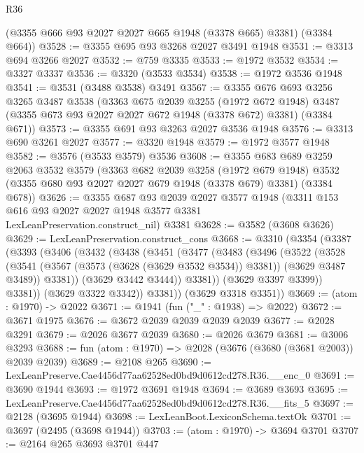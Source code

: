 \begin{lexlean}{R36}
\begin{coremodule}
      (@3355 @666 @93 @2027 @2027 @665 @1948 (@3378 @665) @3381)
      (@3384 @664))
@3528 := @3355 @695 @93 @3268 @2027 @3491 @1948
@3531 := @3313 @694 @3266 @2027
@3532 := @759 @3335
@3533 := @1972 @3532
@3534 := @3327 @3337
@3536 := @3320 (@3533 @3534)
@3538 := @1972 @3536 @1948
@3541 := @3531 (@3488 @3538) @3491
@3567 := @3355
    @676
    @693
    @3256
    @3265
    @3487
    @3538
    (@3363
      @675
      @2039
      @3255
      (@1972 @672 @1948)
      @3487
      (@3355 @673 @93 @2027 @2027 @672 @1948 (@3378 @672) @3381)
      (@3384 @671))
@3573 := @3355 @691 @93 @3263 @2027 @3536 @1948
@3576 := @3313 @690 @3261 @2027
@3577 := @3320 @1948
@3579 := @1972 @3577 @1948
@3582 := @3576 (@3533 @3579) @3536
@3608 := @3355
    @683
    @689
    @3259
    @2063
    @3532
    @3579
    (@3363
      @682
      @2039
      @3258
      (@1972 @679 @1948)
      @3532
      (@3355 @680 @93 @2027 @2027 @679 @1948 (@3378 @679) @3381)
      (@3384 @678))
@3626 := @3355
    @687
    @93
    @2039
    @2027
    @3577
    @1948
    (@3311 @153 @616 @93 @2027 @2027 @1948 @3577 @3381 LexLeanPreservation.construct_nil)
    @3381
@3628 := @3582 (@3608 @3626)
@3629 := LexLeanPreservation.construct_cons
@3668 := @3310
    (@3354
      (@3387
        (@3393
          (@3406
            (@3432
              (@3438
                (@3451
                  (@3477
                    (@3483
                      (@3496
                        (@3522
                          (@3528
                            (@3541
                              (@3567 (@3573 (@3628 (@3629 @3532 @3534)) @3381))
                              (@3629 @3487 @3489))
                            @3381))
                        (@3629 @3442 @3444))
                      @3381))
                  (@3629 @3397 @3399))
                @3381))
            (@3629 @3322 @3342))
          @3381))
      (@3629 @3318 @3351))
@3669 := (atom : @1970) -> @2022
@3671 := @1941 (fun ("_" : @1938) => @2022)
@3672 := @3671 @1975
@3676 := @3672 @2039 @2039 @2039 @2039
@3677 := @2028 @3291
@3679 := @2026 @3677 @2039
@3680 := @2026 @3679
@3681 := @3006 @3293
@3688 := fun (atom : @1970) => @2028 (@3676 (@3680 (@3681 @2003)) @2039 @2039)
@3689 := @2108 @265
@3690 := LexLeanPreserve.Cae4456d77aa62528ed0bd9d0612cd278.R36.__enc_0
@3691 := @3690 @1944
@3693 := @1972 @3691 @1948
@3694 := @3689 @3693
@3695 := LexLeanPreserve.Cae4456d77aa62528ed0bd9d0612cd278.R36.__fits_5
@3697 := @2128 (@3695 @1944)
@3698 := LexLeanBoot.LexiconSchema.textOk
@3701 := @3697 (@2495 (@3698 @1944))
@3703 := (atom : @1970) -> @3694 @3701
@3707 := @2164 @265 @3693 @3701 @447

\end{coremodule}
\end{lexlean}
